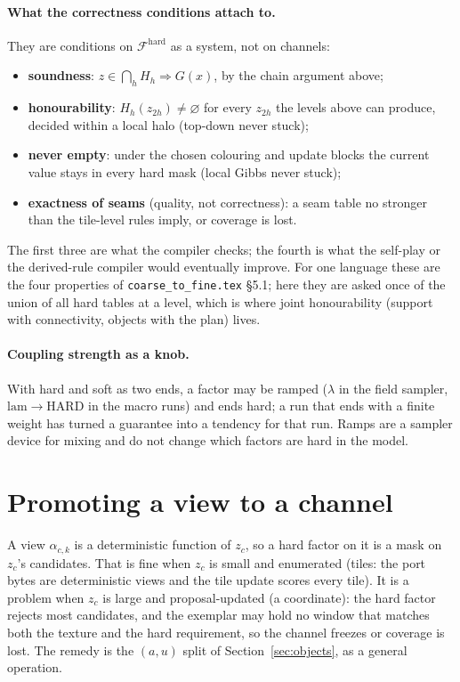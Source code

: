 \documentclass[11pt]{article}
\newcommand{\1}{\mathds{1}}
\begin{document}
\paragraph{What the correctness conditions attach to.} They are conditions on
$\mathcal F^{\mathrm{hard}}$ as a system, not on channels:
\begin{itemize}
  \item \textbf{soundness}: $z \in \bigcap_h H_h \Rightarrow G(x)$, by the chain argument above;
  \item \textbf{honourability}: $H_h(z_{2h}) \ne \varnothing$ for every $z_{2h}$ the levels
        above can produce, decided within a local halo (top-down never stuck);
  \item \textbf{never empty}: under the chosen colouring and update blocks the
        current value stays in every hard mask (local Gibbs never stuck);
  \item \textbf{exactness of seams} (quality, not correctness): a seam table no
        stronger than the tile-level rules imply, or coverage is lost.
\end{itemize}
The first three are what the compiler checks; the fourth is what the
self-play or the derived-rule compiler would eventually improve. For one
language these are the four properties of \texttt{coarse\_to\_fine.tex}
\S5.1; here they are asked once of the union of all hard tables at a level,
which is where joint honourability (support with connectivity, objects with
the plan) lives.

\paragraph{Coupling strength as a knob.} With hard and soft as two ends, a
factor may be ramped ($\lambda$ in the field sampler, $\mathrm{lam} \to \mathrm{HARD}$
in the macro runs) and ends hard; a run that ends with a finite weight has
turned a guarantee into a tendency for that run. Ramps are a sampler device
for mixing and do not change which factors are hard in the model.

\section{Promoting a view to a channel}
\label{sec:promote}

A view $\alpha_{c,k}$ is a deterministic function of $z_c$, so a hard factor on
it is a mask on $z_c$'s candidates. That is fine when $z_c$ is small and
enumerated (tiles: the port bytes are deterministic views and the tile update
scores every tile). It is a problem when $z_c$ is large and proposal-updated
(a coordinate): the hard factor rejects most candidates, and the exemplar may
hold no window that matches both the texture and the hard requirement, so the
channel freezes or coverage is lost. The remedy is the $(a, u)$ split of
Section~\ref{sec:objects}, as a general operation.
\end{document}
